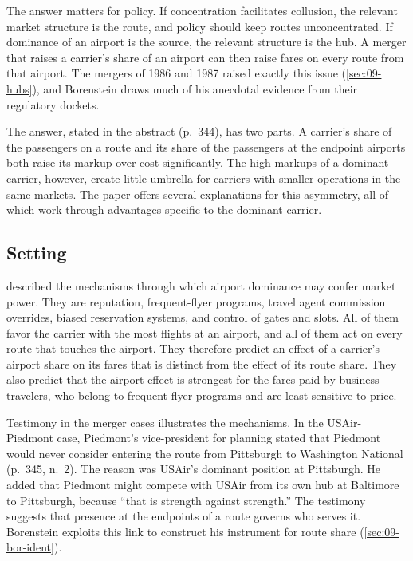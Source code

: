 The answer matters for policy. If concentration facilitates collusion, the relevant market structure is the
route, and policy should keep routes unconcentrated. If dominance of an airport is the source, the relevant
structure is the hub. A merger that raises a carrier's share of an airport can then raise fares on every route
from that airport. The mergers of 1986 and 1987 raised exactly this issue (\cref{sec:09-hubs}), and Borenstein
draws much of his anecdotal evidence from their regulatory dockets.

The answer, stated in the abstract (p.~344), has two parts. A carrier's share of the passengers on a route and
its share of the passengers at the endpoint airports both raise its markup over cost significantly. The high
markups of a dominant carrier, however, create little umbrella for carriers with smaller operations in the same
markets. The paper offers several explanations for this asymmetry, all of which work through advantages
specific to the dominant carrier.

\subsection{Setting}\label{sec:09-bor-setting}

 described the mechanisms through which airport dominance may confer market
power. They are reputation, frequent-flyer programs, travel agent commission overrides, biased reservation
systems, and control of gates and slots. All of them favor the carrier with the most flights at an airport, and
all of them act on every route that touches the airport. They therefore predict an effect of a carrier's
airport share on its fares that is distinct from the effect of its route share. They also predict that the
airport effect is strongest for the fares paid by business travelers, who belong to frequent-flyer programs and
are least sensitive to price.

Testimony in the merger cases illustrates the mechanisms. In the USAir-Piedmont case, Piedmont's
vice-president for planning stated that Piedmont would never consider entering the route from Pittsburgh to
Washington National (p.~345, n.~2). The reason was USAir's dominant position at Pittsburgh. He added that Piedmont
might compete with USAir from its own hub at Baltimore to Pittsburgh, because ``that is strength against
strength.'' The testimony suggests that presence at the endpoints of a route governs who serves it. Borenstein
exploits this link to construct his instrument for route share (\cref{sec:09-bor-ident}).

